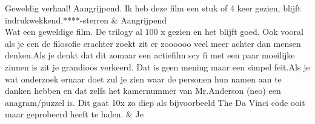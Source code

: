\begin{appendices}
\begin{table}[]
\begin{tabu}
Geweldig verhaal! Aangrijpend. Ik heb deze film een stuk of 4 keer gezien, blijft indrukwekkend.****-sterren                                                                                                                                                                                                                                                                                                                                                                                                                                                                                                                                                                                                                                                                                                                                                                                                                                                                                                                                                                                                                                                                                                                                                                                                                                                                                                                                                                                    & Aangrijpend                          \\ \hline
Wat een geweldige film. De trilogy al 100 x gezien en het blijft goed. Ook vooral als je een de filosofie erachter zoekt zit er zoooooo veel meer achter dan mensen denken.Als je denkt dat dit zomaar een actiefilm scy fi met een paar moeilijke zinnen is zit je grandioos verkeerd. Dat is geen mening maar een simpel feit.Als je wat onderzoek ernaar doet zul je zien waar de personen hun namen aan te danken hebben en dat zelfs het kamernummer van Mr.Anderson (neo) een anagram/puzzel is. Dit gaat 10x zo diep als bijvoorbeeld The Da Vinci code ooit maar geprobeerd heeft te halen.                                                                                                                                                                                                                                                                                                                                                                                                                                                                                                                                                                                                                                                                                                                                                                                                                                                                                             & Je                                   \\ \hline

\end{tabu}
\end{table}
\end{appendices}
